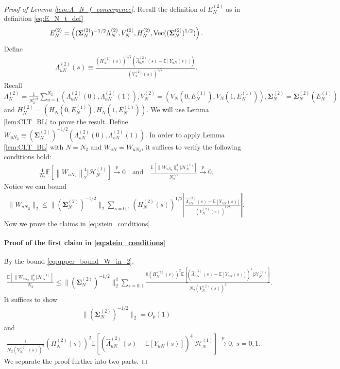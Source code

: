 \documentclass[12pt]{article}
\newcommand{\E}{\mathbb E}								%
\newcommand{\convp}{\overset p \rightarrow}             %
\begin{document}
\begin{proof}[Proof of Lemma \ref{lem:A_N_f_convergence}]
	Recall the definition of $E_N^{(2)}$ as in definition \eqref{eq:E_N_t_def}
	\begin{align*}
		E_N^{(2)}=\left((\bm\Sigma_{N}^{(2)})^{-1/2}\Lambda_{N}^{(2)},V_N^{(2)},H_N^{(2)},\textnormal{Vec}((\bm\Sigma_{N}^{(2)})^{1/2})\right).
	\end{align*}
	Define 
	\begin{align*}
		\Lambda_{uN}^{(2)}(s)\equiv \frac{(H_N^{(2)}(s))^{1/2}(\hat{\Lambda}_{uN}^{(2)}(s)-\E[Y_{uN}(s)])}{(V_N^{(2)}(s))^{1/2}}.
	\end{align*}
	Recall $\Lambda_{N}^{(2)}=\frac{1}{N_2^{1/2}}\sum_{u=1}^{N_2} (\Lambda_{uN}^{(2)}(0),\Lambda_{uN}^{(2)}(1)),V_N^{(2)}=(V_N(0,E_N^{(1)}),V_N(1,E_N^{(1)})),\bm\Sigma_{N}^{(2)}=\bm\Sigma_{N}^{(2)}(E_N^{(1)})$ and $H_N^{(2)}=(H_N(0,E_N^{(1)}),H_N(1,E_N^{(1)}))$. We will use Lemma \ref{lem:CLT_BL} to prove the result. Define $W_{uN_2}\equiv  (\bm\Sigma_{N}^{(2)})^{-1/2}(\Lambda_{uN}^{(2)}(0),\Lambda_{uN}^{(2)}(1))$. In order to apply Lemma \ref{lem:CLT_BL} with $N=N_2$ and $W_{uN}=W_{uN_2}$, it suffices to verify the following conditions hold:
	\begin{align}\label{eq:stein_conditions}
		\frac{1}{N_2}\E\left[\left\|W_{uN_2}\right\|_2^4|\mathcal{H}^{(1)}_{N}\right]\convp 0\quad\text{and}\quad \frac{\E\left[\|W_{uN_2}\|_2^3|\mathcal{H}^{(1)}_{N}\right]}{N_2^{1/2}}\convp 0.
	\end{align}
	Notice we can bound 
	\begin{align}\label{eq:upper_bound_W_in_2}
		\|W_{uN_2}\|_2\leq \|(\bm \Sigma_N^{(2)})^{-1/2}\|_2\sum_{s=0,1}(H_N^{(2)}(s))^{1/2}\left|\frac{\hat{\Lambda}_{uN}^{(2)}(s)-\E[Y_{uN}(s)]}{(V_N^{(2)}(s))^{1/2}}\right|.	
	\end{align}
	Now we prove the claims in \eqref{eq:stein_conditions}.

	\paragraph{Proof of the first claim in \eqref{eq:stein_conditions}}

	By the bound \eqref{eq:upper_bound_W_in_2},
	\begin{align*}
		\frac{\E\left[\|W_{uN_2}\|_2^4|\mathcal{H}^{(1)}_{N}\right]}{N_2}\leq \|(\bm \Sigma_N^{(2)})^{-1/2}\|_2^4\sum_{s=0,1}\frac{8(H_N^{(2)}(s))^2\E\left[(\hat{\Lambda}_{uN}^{(2)}(s)-\E[Y_{uN}(s)])^4|\mathcal{H}^{(1)}_{N}\right]}{N_2(V_{N}^{(2)}(s))^2}.
	\end{align*}
	It suffices to show 
	\begin{align}\label{eq:upper_bound_Sigma_N_2_eigenvalue}
		\|(\bm \Sigma_N^{(2)})^{-1/2}\|_2=O_p(1)
	\end{align}
	and 
	\begin{align}\label{eq:upper_bound_Normalized_variable}
		\frac{1}{N_2(V_N^{(2)}(s))^2}(H_N^{(2)}(s))^2\E\left[(\hat{\Lambda}_{uN}^{(2)}(s)-\E[Y_{uN}(s)])^4|\mathcal{H}^{(1)}_{N}\right]\convp 0,\ s=0,1.
	\end{align}
	We separate the proof further into two parts. 
	

\end{proof}
\end{document}
